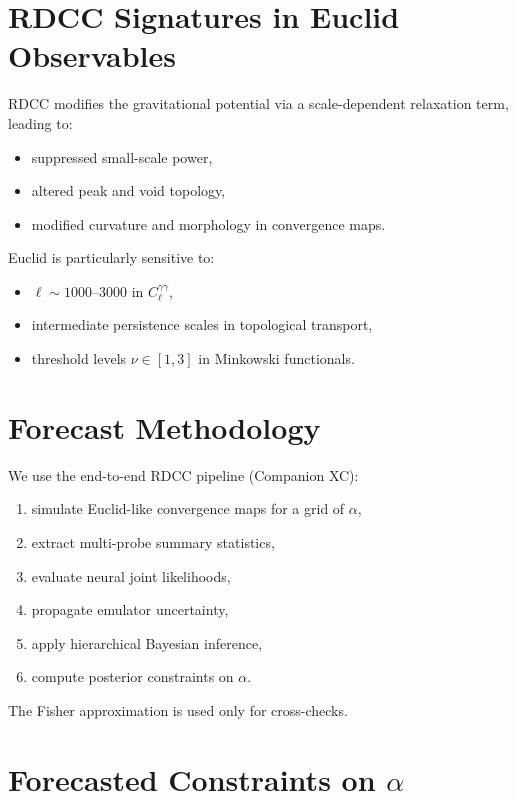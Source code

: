 \documentclass[11pt,a4paper]{article}
\begin{document}
\section{RDCC Signatures in Euclid Observables}

RDCC modifies the gravitational potential via a scale-dependent relaxation term, 
leading to:

\begin{itemize}
    \item suppressed small-scale power,
    \item altered peak and void topology,
    \item modified curvature and morphology in convergence maps.
\end{itemize}

Euclid is particularly sensitive to:

\begin{itemize}
    \item $\ell \sim 1000$--$3000$ in $C_{\ell}^{\gamma\gamma}$,
    \item intermediate persistence scales in topological transport,
    \item threshold levels $\nu \in [1,3]$ in Minkowski functionals.
\end{itemize}
\section{Forecast Methodology}

We use the end-to-end RDCC pipeline (Companion XC):

\begin{enumerate}
    \item simulate Euclid-like convergence maps for a grid of $\alpha$,
    \item extract multi-probe summary statistics,
    \item evaluate neural joint likelihoods,
    \item propagate emulator uncertainty,
    \item apply hierarchical Bayesian inference,
    \item compute posterior constraints on $\alpha$.
\end{enumerate}

The Fisher approximation is used only for cross-checks.
\section{Forecasted Constraints on \texorpdfstring{$\alpha$}{alpha}}
\end{document}

